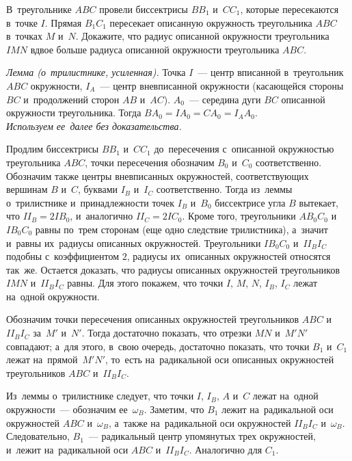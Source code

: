 \begin{problems}

\item
В~треугольнике $ABC$ провели биссектрисы $B B_1$ и~$C C_1$, которые
пересекаются в~точке $I$.
Прямая $B_1 C_1$ пересекает описанную окружность треугольника $ABC$
в~точках $M$ и~$N$.
Докажите, что радиус описанной окружности треугольника $IMN$ вдвое больше
радиуса описанной окружности треугольника $ABC$.

\end{problems}

\ifincludesolutions
\begin{figure}[ht]\begin{center}
\end{center}\end{figure}
\emph{Лемма (о~трилистнике, усиленная).}
Точка $I$~--- центр вписанной в~треугольник $ABC$ окружности, $I_A$~--- центр
вневписанной окружности (касающейся стороны~$BC$ и~продолжений сторон
$AB$ и~$AC$).
$A_0$~--- середина дуги $BC$ описанной окружности треугольника.
Тогда $B A_0 = I A_0 = C A_0 = I_A A_0$.
\\
\emph{Используем ее~далее без доказательства.}
\par
Продлим биссектрисы $BB_1$ и~$CC_1$ до~пересечения с~описанной окружностью
треугольника $ABC$, точки пересечения обозначим $B_0$ и~$C_0$ соответственно.
Обозначим также центры вневписанных окружностей, соответствующих вершинам $B$
и~$C$, буквами $I_B$ и~$I_C$ соответственно.
Тогда из~леммы о~трилистнике и~принадлежности точек $I_B$ и~$B_0$ биссектрисе
угла $B$ вытекает, что $II_B = 2IB_0$, и~аналогично $II_C = 2IC_0$.
Кроме того, треугольники $AB_0C_0$ и~$IB_0C_0$ равны по~трем сторонам (еще одно
следствие трилистника), а~значит и~равны их~радиусы описанных окружностей.
Треугольники $IB_0C_0$ и~$II_BI_C$ подобны с~коэффициентом $2$, радиусы их~описанных окружностей относятся так~же.
Остается доказать, что радиусы описанных окружностей треугольников $IMN$ и~$II_BI_C$ равны.
Для этого покажем, что точки $I$, $M$, $N$, $I_B$, $I_C$ лежат на~одной
окружности.
\par
Обозначим точки пересечения описанных окружностей треугольников $ABC$
и~$I I_B I_C$ за~$M'$ и~$N'$.
Тогда достаточно показать, что отрезки $M N$ и~$M'N'$ совпадают;
а~для этого, в~свою очередь, достаточно показать, что точки $B_1$ и~$C_1$ лежат
на~прямой~$M'N'$, то~есть на~радикальной оси описанных окружностей
треугольников $ABC$ и~$I I_B I_C$.
\par
Из~леммы о~трилистнике следует, что точки $I$, $I_B$, $A$ и~$C$ лежат на~одной
окружности~--- обозначим ее~$\omega_B$.
Заметим, что $B_1$ лежит на~радикальной оси окружностей $ABC$ и~$\omega_B$,
а~также на~радикальной оси окружностей $I I_B I_C$ и~$\omega_B$.
Следовательно, $B_1$~--- радикальный центр упомянутых трех окружностей,
и~лежит на~радикальной оси $ABC$ и~$I I_B I_C$.
Аналогично для $C_1$.
\fi %

\endgroup %

